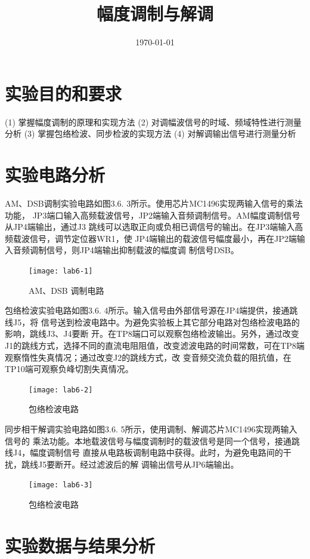 \documentclass{../source/Experiment}
\title{幅度调制与解调}
\date{\today}
\begin{document}
\makecover
\makeheader


\section{实验目的和要求}
 (1) 掌握幅度调制的原理和实现方法
(2) 对调幅波信号的时域、频域特性进行测量分析
(3) 掌握包络检波、同步检波的实现方法
(4) 对解调输出信号进行测量分析

\section{实验电路分析}

AM、DSB调制实验电路如图3.6. 3所示。使用芯片MC1496实现两输入信号的乘法功能，    JP3端口输入高频载波信号，JP2端输入音频调制信号。AM幅度调制信号从JP4端输出，通过J3    跳线可以选取正向或负相已调信号的输出。在JP3端输入高频载波信号，调节定位器WR1，使    JP4端输出的载波信号幅度最小，再在JP2端输入音频调制信号，则JP4端输出抑制载波的幅度调    制信号DSB。

\begin{figure}[H]
    \centering
    \texttt{[image: lab6-1]}
    \caption{AM、DSB 调制电路}
\end{figure}

包络检波实验电路如图3.6. 4所示。输入信号由外部信号源在JP4端提供，接通跳线J5，将    信号送到检波电路中。为避免实验板上其它部分电路对包络检波电路的影响，跳线J3、J4要断    开。在TP8端口可以观察包络检波输出。另外，通过改变J1的跳线方式，选择不同的直流电阻阻值，改变滤波电路的时间常数，可在TP8端观察惰性失真情况；通过改变J2的跳线方式，改    变音频交流负载的阻抗值，在TP10端可观察负峰切割失真情况。

\begin{figure}[H]
    \centering
    \texttt{[image: lab6-2]}
    \caption{包络检波电路}
\end{figure}

同步相干解调实验电路如图3.6. 5所示，使用调制、解调芯片MC1496实现两输入信号的    乘法功能。本地载波信号与幅度调制时的载波信号是同一个信号，接通跳线J4，幅度调制信号    直接从电路板调制电路中获得。此时，为避免电路间的干扰，跳线J5要断开。经过滤波后的解    调输出信号从JP6端输出。

\begin{figure}[H]
    \centering
    \texttt{[image: lab6-3]}
    \caption{包络检波电路}
\end{figure}

\section{实验数据与结果分析}
\end{document}
